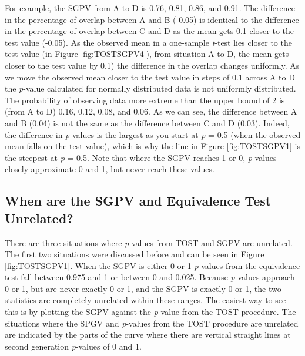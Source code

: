 \documentclass[floatsintext,man]{apa6}
\theoremstyle{definition}
\theoremstyle{definition}
\theoremstyle{definition}
\theoremstyle{remark}
\begin{document}
For example, the SGPV from A to D is 0.76, 0.81, 0.86, and 0.91. The
difference in the percentage of overlap between A and B (-0.05) is
identical to the difference in the percentage of overlap between C and D
as the mean gets 0.1 closer to the test value (-0.05). As the observed
mean in a one-sample \emph{t}-test lies closer to the test value (in
Figure \ref{fig:TOSTSGPV4}), from situation A to D, the mean gets closer
to the test value by 0.1) the difference in the overlap changes
uniformly. As we move the observed mean closer to the test value in
steps of 0.1 across A to D the \emph{p}-value calculated for normally
distributed data is not uniformly distributed. The probability of
observing data more extreme than the upper bound of 2 is (from A to D)
0.16, 0.12, 0.08, and 0.06. As we can see, the difference between A and
B (0.04) is not the same as the difference between C and D (0.03).
Indeed, the difference in \emph{p}-values is the largest as you start at
\emph{p} = 0.5 (when the observed mean falls on the test value), which
is why the line in Figure \ref{fig:TOSTSGPV1} is the steepest at
\emph{p} = 0.5. Note that where the SGPV reaches 1 or 0, \emph{p}-values
closely approximate 0 and 1, but never reach these values.

\subsection{When are the SGPV and Equivalence Test
Unrelated?}\label{when-are-the-sgpv-and-equivalence-test-unrelated}

There are three situations where \emph{p}-values from TOST and SGPV are
unrelated. The first two situations were discussed before and can be
seen in Figure \ref{fig:TOSTSGPV1}. When the SGPV is either 0 or 1
\emph{p}-values from the equivalence test fall between 0.975 and 1 or
between 0 and 0.025. Because \emph{p}-values approach 0 or 1, but are
never exactly 0 or 1, and the SGPV is exactly 0 or 1, the two statistics
are completely unrelated within these ranges. The easiest way to see
this is by plotting the SGPV against the \emph{p}-value from the TOST
procedure. The situations where the SPGV and \emph{p}-values from the
TOST procedure are unrelated are indicated by the parts of the curve
where there are vertical straight lines at second generation
\emph{p}-values of 0 and 1.
\end{document}
